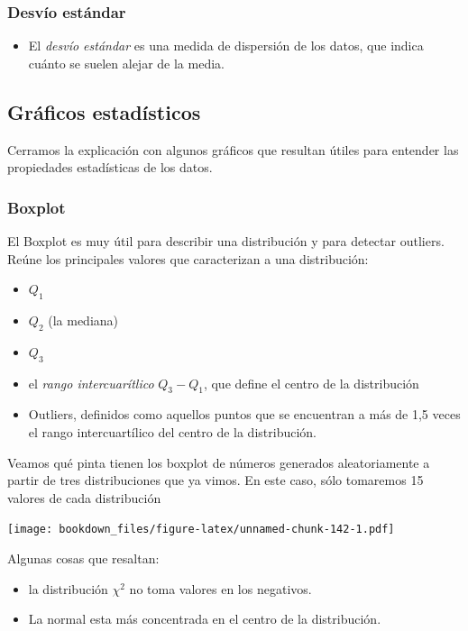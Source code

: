 \documentclass[]{book}
\providecommand{\tightlist}{%
  \setlength{\itemsep}{0pt}\setlength{\parskip}{0pt}}
\begin{document}
\hypertarget{desvio-estandar}{%
\subsubsection{Desvío estándar}\label{desvio-estandar}}

\begin{itemize}
\tightlist
\item
  El \emph{desvío estándar} es una medida de dispersión de los datos, que indica cuánto se suelen alejar de la media.
\end{itemize}

\hypertarget{graficos-estadisticos}{%
\subsection{Gráficos estadísticos}\label{graficos-estadisticos}}

Cerramos la explicación con algunos gráficos que resultan útiles para entender las propiedades estadísticas de los datos.

\hypertarget{boxplot}{%
\subsubsection{Boxplot}\label{boxplot}}

El Boxplot es muy útil para describir una distribución y para detectar outliers. Reúne los principales valores que caracterizan a una distribución:

\begin{itemize}
\tightlist
\item
  \(Q_1\)
\item
  \(Q_2\) (la mediana)
\item
  \(Q_3\)
\item
  el \emph{rango intercuarítlico} \(Q_3 - Q_1\), que define el centro de la distribución
\item
  Outliers, definidos como aquellos puntos que se encuentran a más de 1,5 veces el rango intercuartílico del centro de la distribución.
\end{itemize}

Veamos qué pinta tienen los boxplot de números generados aleatoriamente a partir de tres distribuciones que ya vimos. En este caso, sólo tomaremos 15 valores de cada distribución

\texttt{[image: bookdown\_files/figure-latex/unnamed-chunk-142-1.pdf]}

Algunas cosas que resaltan:

\begin{itemize}
\tightlist
\item
  la distribución \(\chi^2\) no toma valores en los negativos.
\item
  La normal esta más concentrada en el centro de la distribución.
\end{itemize}
\end{document}

